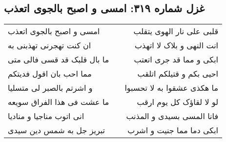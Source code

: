 \begin{center}
\section*{غزل شماره ۳۱۹: امسی و اصبح بالجوی اتعذب}
\label{sec:0319}
\begin{longtable}{l p{0.5cm} r}
امسی و اصبح بالجوی اتعذب
&&
قلبی علی نار الهوی یتقلب
\\
ان کنت تهجرنی تهذبنی به
&&
انت النهی و بلاک لا اتهذب
\\
ما بال قلبک قد قسی فالی متی
&&
ابکی و مما قد جری اتعتب
\\
مما احب بان اقول فدیتکم
&&
احیی بکم و قتیلکم اتلقب
\\
و اشرتم بالصبر لی متسلیا
&&
ما هکذی عشقوا به لا تحسبوا
\\
ما عشت فی هذا الفراق سویعه
&&
لو لا لقاؤک کل یوم ارقب
\\
انی اتوب مناجیا و منادیا
&&
فانا المسی بسیدی و المذنب
\\
تبریز جل به شمس دین سیدی
&&
ابکی دما مما جنیت و اشرب
\\
\end{longtable}
\end{center}
